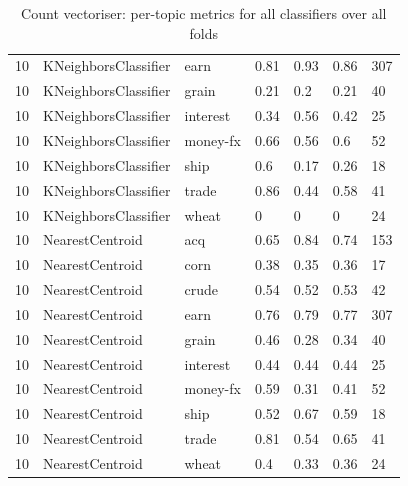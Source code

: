 \documentclass{article}
\begin{document}
\begin{table}[h]
\begin{tabular}{lllllll}
10            & KNeighborsClassifier   & earn            & 0.81               & 0.93            & 0.86              & 307              \\
10            & KNeighborsClassifier   & grain           & 0.21               & 0.2             & 0.21              & 40               \\
10            & KNeighborsClassifier   & interest        & 0.34               & 0.56            & 0.42              & 25               \\
10            & KNeighborsClassifier   & money-fx        & 0.66               & 0.56            & 0.6               & 52               \\
10            & KNeighborsClassifier   & ship            & 0.6                & 0.17            & 0.26              & 18               \\
10            & KNeighborsClassifier   & trade           & 0.86               & 0.44            & 0.58              & 41               \\
10            & KNeighborsClassifier   & wheat           & 0                  & 0               & 0                 & 24               \\
10            & NearestCentroid        & acq             & 0.65               & 0.84            & 0.74              & 153              \\
10            & NearestCentroid        & corn            & 0.38               & 0.35            & 0.36              & 17               \\
10            & NearestCentroid        & crude           & 0.54               & 0.52            & 0.53              & 42               \\
10            & NearestCentroid        & earn            & 0.76               & 0.79            & 0.77              & 307              \\
10            & NearestCentroid        & grain           & 0.46               & 0.28            & 0.34              & 40               \\
10            & NearestCentroid        & interest        & 0.44               & 0.44            & 0.44              & 25               \\
10            & NearestCentroid        & money-fx        & 0.59               & 0.31            & 0.41              & 52               \\
10            & NearestCentroid        & ship            & 0.52               & 0.67            & 0.59              & 18               \\
10            & NearestCentroid        & trade           & 0.81               & 0.54            & 0.65              & 41               \\
10            & NearestCentroid        & wheat           & 0.4                & 0.33            & 0.36              & 24              
\end{tabular}
\caption{Count vectoriser: per-topic metrics for all classifiers over all folds}
\end{table}
\end{document}
